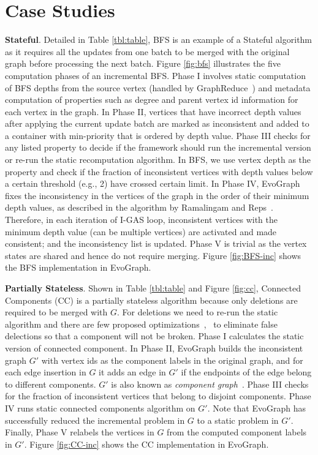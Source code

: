 \section{Case Studies}


\textbf{Stateful}. Detailed in Table \ref{tbl:table}, BFS is an example of a Stateful algorithm as it requires all the updates from one batch to be merged with the original graph before processing the next batch. Figure \ref{fig:bfs} illustrates the five computation phases of an incremental BFS. Phase I involves static computation of BFS depths from the source vertex (handled by GraphReduce~\cite{GraphReduce}) and metadata computation of properties such as degree and parent vertex id information for each vertex in the graph. In Phase II, vertices that have incorrect depth values~\cite{Ramalingam} after applying the current update batch are marked as inconsistent and added to a container with min-priority that is ordered by depth value. Phase III checks for any listed property to decide if the framework should run the incremental version or re-run the static recomputation algorithm. In BFS,  we use vertex depth as the property and check if the fraction of inconsistent vertices with depth values below a certain threshold (e.g., 2) have crossed certain limit. In Phase IV, EvoGraph fixes the inconsistency in the vertices of the graph in the order of their minimum depth values, as described in the algorithm by Ramalingam and Reps~\cite{Ramalingam}. Therefore, in each iteration of I-GAS loop, inconsistent vertices with the minimum depth value (can be multiple vertices) are activated and made consistent; and the inconsistency list is updated. Phase V is trivial as the vertex states are shared and hence do not require merging. Figure \ref{fig:BFS-inc} shows the BFS implementation in EvoGraph.



\textbf{Partially Stateless}. Shown in Table \ref{tbl:table} and Figure \ref{fig:cc}, Connected Components (CC) is a partially stateless algorithm because only deletions are required to be merged with  $G$.  For deletions we need to re-run the static algorithm and there are few proposed optimizations~\cite{CC},~\cite{CC_new} to eliminate false delections so that a component will not be broken. Phase I calculates the static version of connected component. In Phase II, EvoGraph builds the inconsistent graph $G'$ with vertex ids as the component labels in the original graph, and for each edge insertion in $G$ it adds an edge in $G'$ if the endpoints of the edge belong to different components. $G'$ is also known as \textit{component graph}~\cite{CC}. Phase III checks for the fraction of inconsistent vertices that belong to disjoint components. Phase IV runs static connected components algorithm on $G'$. Note that EvoGraph has successfully reduced the incremental problem in $G$ to a static problem in $G'$. Finally, Phase V relabels the vertices in $G$ from the computed component labels in $G'$. Figure \ref{fig:CC-inc} shows the CC implementation in EvoGraph.

